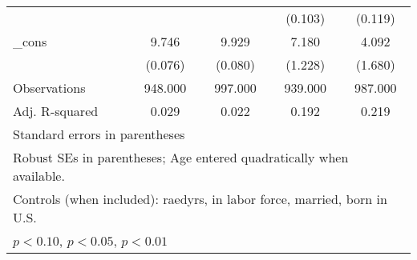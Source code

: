 \begin{table}[htbp]
\begin{tabular}{l*{4}{c}}
          &                  &                  &  (0.103)         &  (0.119)         \\
\_cons    &    9.746\sym{***}&    9.929\sym{***}&    7.180\sym{***}&    4.092\sym{**} \\
          &  (0.076)         &  (0.080)         &  (1.228)         &  (1.680)         \\
\midrule
Observations&  948.000         &  997.000         &  939.000         &  987.000         \\
Adj. R-squared&    0.029         &    0.022         &    0.192         &    0.219         \\
\bottomrule
\multicolumn{5}{l}{\footnotesize Standard errors in parentheses}\\
\multicolumn{5}{l}{\footnotesize Robust SEs in parentheses; Age entered quadratically when available.}\\
\multicolumn{5}{l}{\footnotesize Controls (when included): raedyrs, in labor force, married, born in U.S.}\\
\multicolumn{5}{l}{\footnotesize \sym{*} \(p<0.10\), \sym{**} \(p<0.05\), \sym{***} \(p<0.01\)}\\
\end{tabular}
\end{table}
